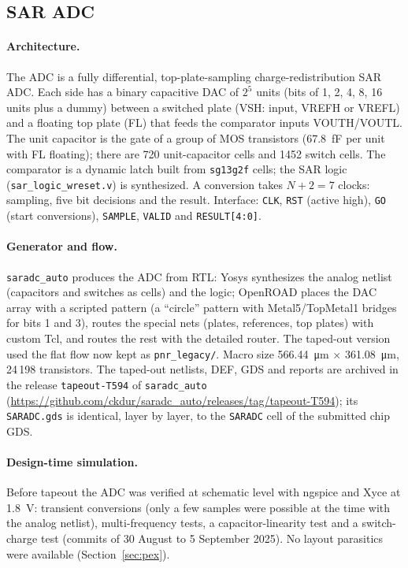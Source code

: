 \documentclass[10pt,a4paper]{article}
\begin{document}
\subsection{SAR ADC}
\label{sec:adc_design}
\paragraph{Architecture.} The ADC is a fully differential, top-plate-sampling charge-redistribution
SAR ADC. Each side has a binary capacitive DAC of $2^5$ units (bits of 1, 2, 4, 8, 16 units plus a
dummy) between a switched plate (VSH: input, VREFH or VREFL) and a floating top plate (FL) that feeds
the comparator inputs VOUTH/VOUTL. The unit capacitor is the gate of a group of MOS transistors
(\SI{67.8}{fF} per unit with FL floating); there are 720 unit-capacitor cells and 1452 switch cells. The
comparator is a dynamic latch built from \texttt{sg13g2f} cells; the SAR logic
(\texttt{sar\_logic\_wreset.v}) is synthesized. A conversion takes $N + 2 = 7$ clocks: sampling, five
bit decisions and the result. Interface: \texttt{CLK}, \texttt{RST} (active high), \texttt{GO} (start
conversions), \texttt{SAMPLE}, \texttt{VALID} and \texttt{RESULT[4:0]}.

\paragraph{Generator and flow.} \texttt{saradc\_auto} produces the ADC from RTL: Yosys synthesizes the
analog netlist (capacitors and switches as cells) and the logic; OpenROAD places the DAC array with a
scripted pattern (a ``circle'' pattern with Metal5/TopMetal1 bridges for bits 1 and 3), routes the special
nets (plates, references, top plates) with custom Tcl, and routes the rest with the detailed router. The
taped-out version used the flat flow now kept as \texttt{pnr\_legacy/}. Macro size
\SI{566.44}{\micro m} $\times$ \SI{361.08}{\micro m}, 24\,198 transistors. The taped-out netlists, DEF,
GDS and reports are archived in the release \texttt{tapeout-T594} of \texttt{saradc\_auto}
(\url{https://github.com/ckdur/saradc_auto/releases/tag/tapeout-T594}); its \texttt{SARADC.gds} is
identical, layer by layer, to the \texttt{SARADC} cell of the submitted chip GDS.

\paragraph{Design-time simulation.} Before tapeout the ADC was verified at schematic level with
ngspice and Xyce at \SI{1.8}{V}: transient conversions (only a few samples were possible at the
time with the analog netlist), multi-frequency tests, a capacitor-linearity test and a switch-charge
test (commits of 30 August to 5 September 2025). No layout parasitics were available
(Section~\ref{sec:pex}).
\end{document}
